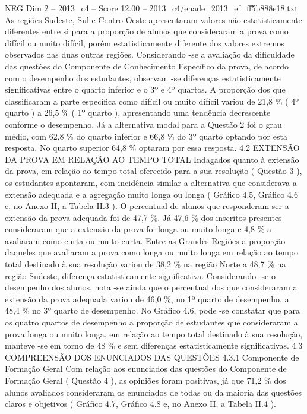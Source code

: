 \begin{textsample}{NEG Dim 2 – 2013\_c4 – Score 12.00 – 2013\_c4/enade\_2013\_ef\_ff5b888e18.txt}
As regiões Sudeste, Sul e Centro-Oeste apresentaram valores não estatisticamente diferentes entre si para a proporção de alunos que consideraram a prova como difícil ou muito difícil, porém estatisticamente diferente dos valores extremos observados nas duas outras regiões.
Considerando -se a avaliação da dificuldade das questões do Componente de Conhecimento Específico da prova, de acordo com o desempenho dos estudantes, observam -se diferenças estatisticamente significativas entre o quarto inferior e o 3º e 4º quartos.
A proporção dos que classificaram a parte específica como difícil ou muito difícil variou de 21,8 \% ( 4º quarto ) a 26,5 \% ( 1º quarto ), apresentando uma tendência decrescente conforme o desempenho.
Já a alternativa modal para a Questão 2 foi o grau médio, com 62,8 \% do quarto inferior e 66,8 \% do 3º quarto optando por esta resposta.
No quarto superior 64,8 \% optaram por essa resposta. 4.2 EXTENSÃO DA PROVA EM RELAÇÃO AO TEMPO TOTAL Indagados quanto à extensão da prova, em relação ao tempo total oferecido para a sua resolução ( Questão 3 ), os estudantes apontaram, com incidência similar a alternativa que considerava a extensão adequada e a agregação muito longa ou longa ( Gráfico 4.5, Gráfico 4.6 e, no Anexo II, a Tabela II.3 ).
O percentual de alunos que responderam ser a extensão da prova adequada foi de 47,7 \%.
Já 47,6 \% dos inscritos presentes consideraram que a extensão da prova foi longa ou muito longa e 4,8 \% a avaliaram como curta ou muito curta.
Entre as Grandes Regiões a proporção daqueles que avaliaram a prova como longa ou muito longa em relação ao tempo total destinado à sua resolução variou de 38,2 \% na região Norte a 48,7 \% na região Sudeste, diferença estatisticamente significativa.
Considerando -se o desempenho dos alunos, nota -se ainda que o percentual dos que consideraram a extensão da prova adequada variou de 46,0 \%, no 1º quarto de desempenho, a 48,4 \% no 3º quarto de desempenho.
No Gráfico 4.6, pode -se constatar que para os quatro quartos de desempenho a proporção de estudantes que consideraram a prova longa ou muito longa, em relação ao tempo total destinado à sua resolução, manteve -se em torno de 48 \% e sem diferenças estatisticamente significativas. 4.3 COMPREENSÃO DOS ENUNCIADOS DAS QUESTÕES 4.3.1 Componente de Formação Geral Com relação aos enunciados das questões do Componente de Formação Geral ( Questão 4 ), as opiniões foram positivas, já que 71,2 \% dos alunos avaliados consideraram os enunciados de todas ou da maioria das questões claros e objetivos ( Gráfico 4.7, Gráfico 4.8 e, no Anexo II, a Tabela II.4 ).

\end{textsample}
